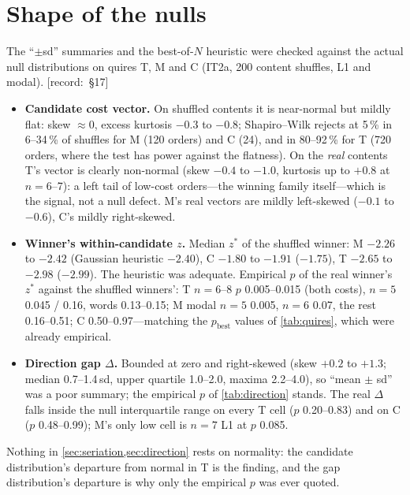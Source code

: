 \documentclass[11pt,a4paper]{article}
\newcommand{\src}[1]{{\footnotesize\color{muted}\sffamily\mbox{[record: \S#1]}}}
\newcommand{\IT}{\textcolor{it2a}{IT2a}}
\begin{document}
\section{Shape of the nulls}
\label{sec:nullshape}

The ``$\pm$sd'' summaries and the best-of-$N$ heuristic were checked against the actual null distributions on quires T, M and C (\IT, 200 content shuffles, L1 and modal). \src{17}
\begin{itemize}
\item \textbf{Candidate cost vector.} On shuffled contents it is near-normal but mildly flat: skew $\approx0$, excess kurtosis $-0.3$ to $-0.8$; Shapiro--Wilk rejects at 5\,\% in 6--34\,\% of shuffles for M (120 orders) and C (24), and in 80--92\,\% for T (720 orders, where the test has power against the flatness). On the \emph{real} contents T's vector is clearly non-normal (skew $-0.4$ to $-1.0$, kurtosis up to $+0.8$ at $n=6$--7): a left tail of low-cost orders---the winning family itself---which is the signal, not a null defect. M's real vectors are mildly left-skewed ($-0.1$ to $-0.6$), C's mildly right-skewed.
\item \textbf{Winner's within-candidate $z$.} Median $z^\ast$ of the shuffled winner: M $-2.26$ to $-2.42$ (Gaussian heuristic $-2.40$), C $-1.80$ to $-1.91$ ($-1.75$), T $-2.65$ to $-2.98$ ($-2.99$). The heuristic was adequate. Empirical $p$ of the real winner's $z^\ast$ against the shuffled winners': T $n=6$--8 $p$ 0.005--0.015 (both costs), $n=5$ 0.045 / 0.16, words 0.13--0.15; M modal $n=5$ 0.005, $n=6$ 0.07, the rest 0.16--0.51; C 0.50--0.97---matching the $p_{\text{best}}$ values of \cref{tab:quires}, which were already empirical.
\item \textbf{Direction gap $\Delta$.} Bounded at zero and right-skewed (skew $+0.2$ to $+1.3$; median 0.7--1.4\,sd, upper quartile 1.0--2.0, maxima 2.2--4.0), so ``mean $\pm$ sd'' was a poor summary; the empirical $p$ of \cref{tab:direction} stands. The real $\Delta$ falls inside the null interquartile range on every T cell ($p$ 0.20--0.83) and on C ($p$ 0.48--0.99); M's only low cell is $n=7$ L1 at $p$ 0.085.
\end{itemize}
Nothing in \cref{sec:seriation,sec:direction} rests on normality: the candidate distribution's departure from normal in T is the finding, and the gap distribution's departure is why only the empirical $p$ was ever quoted.

\end{document}
